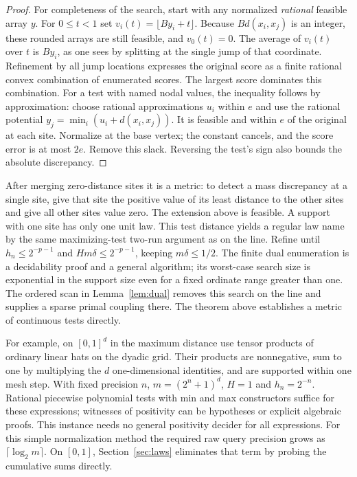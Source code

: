 \begin{proof}
For completeness of the search, start with any normalized \emph{rational}
feasible array $y$. For $0\le t<1$ set $v_i(t)=\lfloor B y_i+t\rfloor$.
Because $Bd(x_i,x_j)$ is an integer, these rounded arrays are still feasible,
and $v_0(t)=0$. The average of $v_i(t)$ over $t$ is $B y_i$, as one sees
by splitting at the single jump of that coordinate. Refinement by all jump
locations expresses the original score as a finite rational convex combination
of enumerated scores. The largest score dominates this combination. For a
test with named nodal values, the inequality follows by approximation: choose
rational approximations $u_i$ within $e$ and use the rational potential
$y_j=\min_i(u_i+d(x_i,x_j))$. It is feasible and within $e$ of the original
at each site. Normalize at the base vertex; the constant cancels, and the
score error is at most $2e$. Remove this slack. Reversing the test's sign
also bounds the absolute discrepancy.
\end{proof}

After merging zero-distance sites it is a metric: to detect a mass discrepancy at a single site, give that site the positive value of its least distance to the other sites and give all other sites value zero. The extension above is feasible. A support with one site has only one unit law. This test distance yields a regular law name by the same maximizing-test
two-run argument as on the line. Refine until $h_n\le2^{-p-1}$ and
$Hm\delta\le2^{-p-1}$, keeping $m\delta\le1/2$. The finite dual
enumeration is a decidability proof and a general algorithm; its worst-case
search size is exponential in the support size even for a fixed ordinate
range greater than one. The ordered scan in Lemma~\ref{lem:dual} removes
this search on the line and supplies a sparse primal coupling there.
The theorem above establishes a metric of continuous tests directly.

For example, on $[0,1]^d$ in the maximum distance use tensor products of
ordinary linear hats on the dyadic grid. Their products are nonnegative,
sum to one by multiplying the $d$ one-dimensional identities, and are
supported within one mesh step. With fixed precision $n$, $m=(2^n+1)^d$,
$H=1$ and $h_n=2^{-n}$. Rational piecewise polynomial tests with min and
max constructors suffice for these expressions; witnesses of positivity
can be hypotheses or explicit algebraic proofs. This instance needs no
general positivity decider for all expressions. For this simple normalization
method the required raw query precision grows as $\lceil\log_2 m\rceil$.
On $[0,1]$, Section~\ref{sec:laws} eliminates that term by probing the
cumulative sums directly.

